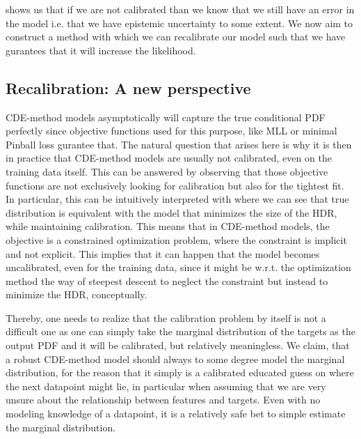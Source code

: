 

 shows us that if we are not calibrated than we know that we still have an error in the model i.e. that we have epistemic uncertainty to some extent. We now aim to construct a method with which we can recalibrate our model such that we have gurantees that it will increase the likelihood.

\subsection{Recalibration: A new perspective} %

CDE-method models asymptotically will capture the true conditional PDF perfectly since objective functions used for this purpose, like MLL or minimal Pinball loss gurantee that. The natural question that arises here is why it is then in practice that CDE-method models are usually not calibrated, even on the training data itself. This can be answered by observing that those objective functions are not exclusively looking for calibration but also for the tightest fit. In particular, this can be intuitively interpreted with  where we can see that true distribution is equivalent with the model that minimizes the size of the HDR, while maintaining calibration. This means that in CDE-method models, the objective is a constrained optimization problem, where the constraint is implicit and not explicit. This implies that it can happen that the model becomes uncalibrated, even for the training data, since it might be w.r.t. the optimization method the way of steepest descent to neglect the constraint but instead to minimize the HDR, conceptually.

Thereby, one needs to realize that the calibration problem by itself is not a difficult one as one can simply take the marginal distribution of the targets as the output PDF and it will be calibrated, but relatively meaningless.
We claim, that a robust CDE-method model should always to some degree model the marginal distribution, for the reason that it simply is a calibrated educated guess on where the next datapoint might lie, in particular when assuming that we are very unsure about the relationship between features and targets. Even with no modeling knowledge of a datapoint, it is a relatively safe bet to simple estimate the marginal distribution. %


